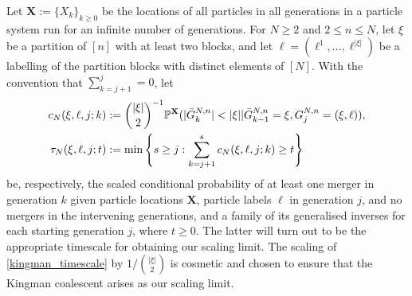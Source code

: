 \documentclass[a4paper,11pt]{article}
\theoremstyle{definition}
\newcommand{\bbP}{\mathbb{P}}
\newcommand{\bfX}{\mathbf{X}}
\begin{document}
Let $\bfX := \{ X_k \}_{ k \geq 0 }$ be the locations of all particles in all generations in a particle system run for an infinite number of generations.
For $N \geq 2$ and $2 \leq n \leq N$, let $\xi$ be a partition of $[n]$ with at least two blocks, and let $\ell = ( \ell^1, \ldots, \ell^{ | \xi | } )$ be a labelling of the partition blocks with distinct elements of $[N]$.
With the convention that $\sum_{k = j + 1}^j = 0$, let 
\begin{align}
c_N( \xi, \ell, j; k ) &:= \binom{ | \xi | }{ 2 }^{ -1 } \bbP^{ \bfX }( | \bar{ G }_k^{N, n} | < | \xi | | \bar{ G }_{ k - 1 }^{N, n} = \xi, G_j^{N, n} = ( \xi, \ell ) ), \label{kingman_timescale} \\
\tau_N( \xi, \ell, j; t ) &:= \min\Bigg\{ s \geq j : \sum_{ k = j + 1 }^s c_N( \xi, \ell, j; k ) \geq t \Bigg\} \notag 
\end{align}
be, respectively, the scaled conditional probability of at least one merger in generation $k$ given particle locations $\bfX$, particle labels $\ell$ in generation $j$, and no mergers in the intervening generations, and a family of its generalised inverses for each starting generation $j$, where $t \geq 0$.
The latter will turn out to be the appropriate timescale for obtaining our scaling limit.
The scaling of \eqref{kingman_timescale} by $1 / \binom{|\xi|}{2}$ is cosmetic and chosen to ensure that the Kingman coalescent arises as our scaling limit.
\end{document}
